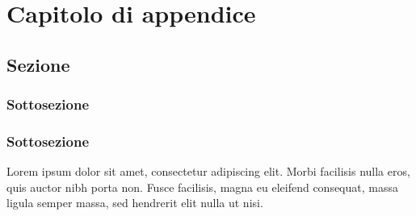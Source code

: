 \chapter{Capitolo di appendice}
\section{Sezione}
\subsection{Sottosezione}
\subsection{Sottosezione}
Lorem ipsum dolor sit amet, consectetur adipiscing elit. Morbi facilisis nulla eros, quis auctor nibh porta non. Fusce facilisis, magna eu eleifend consequat, massa ligula semper massa, sed hendrerit elit nulla ut nisi.
